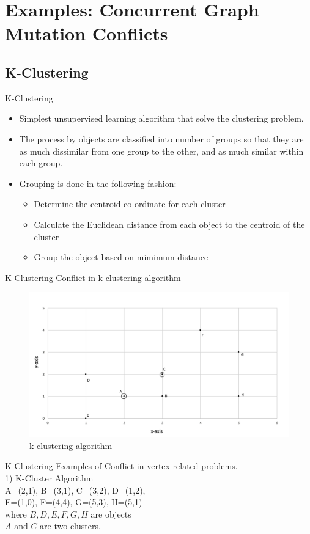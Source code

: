 \section{Examples: Concurrent Graph Mutation Conflicts}
\subsection{K-Clustering}
\begin{frame}{K-Clustering}
  \begin{itemize}
    \item Simplest unsupervised learning algorithm that solve the clustering problem.
    \item The process by objects are classified into number of groups so that they are as much dissimilar from one group to the other,
          and as much similar within each group.
    \item Grouping is done in the following fashion:
          \begin{itemize}
            \item Determine the centroid co-ordinate for each cluster
            \item Calculate the Euclidean distance from each object to the centroid of the cluster
            \item Group the object based on mimimum distance
          \end{itemize}
  \end{itemize}
\end{frame}

\begin{frame}{K-Clustering}
	Conflict in k-clustering algorithm
			\begin{figure}
			\includegraphics[width=0.8\linewidth]{figures/k-cluster.jpg}
			\caption{k-clustering algorithm}
			\end{figure}
\end{frame}

\begin{frame}{K-Clustering}
  Examples of Conflict in vertex related problems.\\
  1) K-Cluster Algorithm\\
  A=(2,1), B=(3,1), C=(3,2), D=(1,2),\\
  E=(1,0), F=(4,4), G=(5,3), H=(5,1)\\ where $B, D, E, F, G, H$ are objects\\
  $A$ and $C$ are two clusters.\\
\end{frame}

